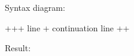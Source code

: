 \documentclass[letterpaper,11pt,english]{sphinxmanual}
\begin{document}
Syntax diagram:

\begin{sphinxVerbatim}[commandchars=\\\{\}]
+\PYGZhy{}\PYGZhy{}\PYGZhy{}\PYGZhy{}\PYGZhy{}\PYGZhy{}+\PYGZhy{}\PYGZhy{}\PYGZhy{}\PYGZhy{}\PYGZhy{}\PYGZhy{}\PYGZhy{}\PYGZhy{}\PYGZhy{}\PYGZhy{}\PYGZhy{}\PYGZhy{}\PYGZhy{}\PYGZhy{}\PYGZhy{}\PYGZhy{}\PYGZhy{}\PYGZhy{}\PYGZhy{}\PYGZhy{}\PYGZhy{}\PYGZhy{}\PYGZhy{}+
 \PYGZdq{}\textbar{} \PYGZdq{} \textbar{} line                  \textbar{}
+\PYGZhy{}\PYGZhy{}\PYGZhy{}\PYGZhy{}\PYGZhy{}\PYGZhy{}\textbar{} continuation line     \textbar{}
       +\PYGZhy{}\PYGZhy{}\PYGZhy{}\PYGZhy{}\PYGZhy{}\PYGZhy{}\PYGZhy{}\PYGZhy{}\PYGZhy{}\PYGZhy{}\PYGZhy{}\PYGZhy{}\PYGZhy{}\PYGZhy{}\PYGZhy{}\PYGZhy{}\PYGZhy{}\PYGZhy{}\PYGZhy{}\PYGZhy{}\PYGZhy{}\PYGZhy{}\PYGZhy{}+
\end{sphinxVerbatim}

Result:
\end{document}

